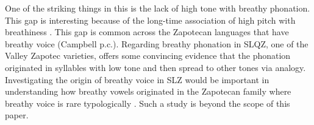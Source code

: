One of the striking things in this is the lack of high tone with breathy phonation. This gap is interesting because of the long-time association of high pitch with breathiness \citep[a good overview–of this association and other phonation types–is found in][]{eslingVoiceQualityLaryngeal2019}. This gap is common across the Zapotecan languages that have breathy voice (Campbell p.c.). Regarding breathy phonation in SLQZ, one of the Valley Zapotec varieties, \citet{uchiharaToneRegistrogenesisQuiavini2016} offers some convincing evidence that the phonation originated in syllables with low tone and then spread to other tones via analogy. Investigating the origin of breathy voice in SLZ would be important in understanding how breathy vowels originated in the Zapotecan family where breathy voice is rare typologically \citep{ariza-garciaPhonationTypesTones2018}. Such a study is beyond the scope of this paper.  